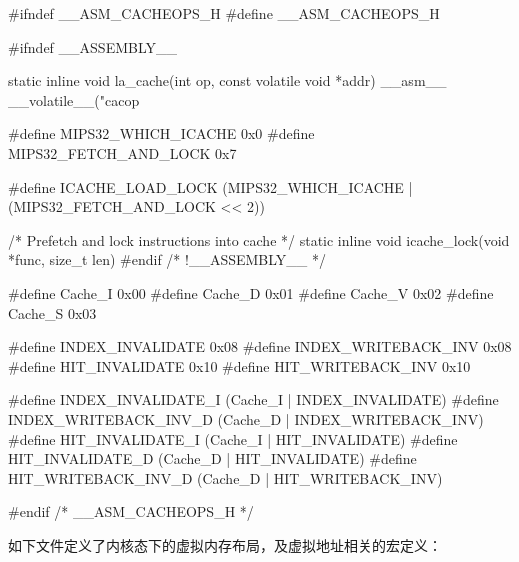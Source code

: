 \begin{CodeBlock}[language=BookC]
#ifndef __ASM_CACHEOPS_H
#define __ASM_CACHEOPS_H

#ifndef __ASSEMBLY__

static inline void la_cache(int op, const volatile void *addr)
{
    __asm__ __volatile__("cacop %
}

#define MIPS32_WHICH_ICACHE                    0x0
#define MIPS32_FETCH_AND_LOCK                  0x7

#define ICACHE_LOAD_LOCK (MIPS32_WHICH_ICACHE | (MIPS32_FETCH_AND_LOCK << 2))

/* Prefetch and lock instructions into cache */
static inline void icache_lock(void *func, size_t len)
{
}
#endif /* !__ASSEMBLY__ */

#define Cache_I             0x00
#define Cache_D             0x01
#define Cache_V             0x02
#define Cache_S             0x03

#define INDEX_INVALIDATE        0x08
#define INDEX_WRITEBACK_INV     0x08
#define HIT_INVALIDATE          0x10
#define HIT_WRITEBACK_INV       0x10

#define INDEX_INVALIDATE_I      (Cache_I | INDEX_INVALIDATE)
#define INDEX_WRITEBACK_INV_D   (Cache_D | INDEX_WRITEBACK_INV)
#define HIT_INVALIDATE_I        (Cache_I | HIT_INVALIDATE)
#define HIT_INVALIDATE_D        (Cache_D | HIT_INVALIDATE)
#define HIT_WRITEBACK_INV_D     (Cache_D | HIT_WRITEBACK_INV)

#endif  /* __ASM_CACHEOPS_H */

\end{CodeBlock}

如下文件定义了内核态下的虚拟内存布局，及虚拟地址相关的宏定义：

